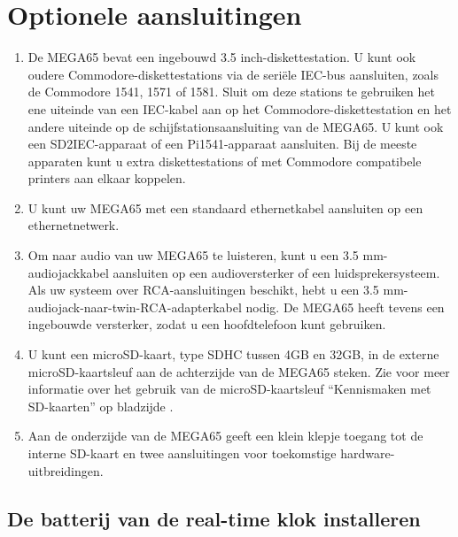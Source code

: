 \section{Optionele aansluitingen}
\begin{enumerate}
	\item De MEGA65 bevat een ingebouwd 3.5 inch-diskettestation. U kunt ook oudere Commodore{\textregistered}-diskettestations via de seriële IEC-bus aansluiten, zoals de Commodore 1541, 1571 of 1581. Sluit om deze stations te gebruiken het ene uiteinde van een IEC-kabel aan op het Commodore-diskettestation en het andere uiteinde op de schijfstationsaansluiting van de MEGA65. U kunt ook een SD2IEC-apparaat of een Pi1541-apparaat aansluiten. Bij de meeste apparaten kunt u extra diskettestations of met Commodore compatibele printers aan elkaar koppelen.	\item U kunt uw MEGA65 met een standaard ethernetkabel aansluiten op een ethernetnetwerk.	\item Om naar audio van uw MEGA65 te luisteren, kunt u een 3.5 mm-audiojackkabel aansluiten op een audioversterker of een luidsprekersysteem. Als uw systeem over RCA-aansluitingen beschikt, hebt u een 3.5 mm-audiojack-naar-twin-RCA-adapterkabel nodig. De MEGA65 heeft tevens een ingebouwde versterker, zodat u een hoofdtelefoon kunt gebruiken.	\item U kunt een microSD-kaart, type SDHC tussen 4GB en 32GB, in de externe microSD-kaartsleuf aan de achterzijde van de MEGA65 steken. Zie voor meer informatie over het gebruik van de microSD-kaartsleuf ``Kennismaken met SD-kaarten'' op bladzijde \pageref{sec:introducing-sd-cards}.	\item Aan de onderzijde van de MEGA65 geeft een klein klepje toegang tot de interne SD-kaart en twee aansluitingen voor toekomstige hardware-uitbreidingen.
\end{enumerate}

\subsection{De batterij van de real-time klok installeren}

